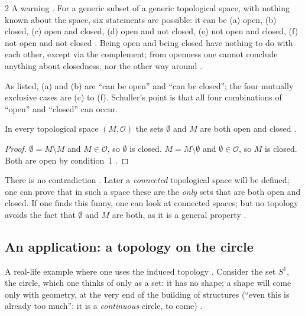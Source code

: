 \begin{paracol}{2}
A warning . For a generic subset of a generic topological space, with nothing known about the
space, six statements are possible: it can be (a) open, (b) closed, (c) open and closed, (d) open and not closed, (e)
not open and closed, (f) not open and not closed . Being open and being closed have
nothing to do with each other, except via the complement; from openness one cannot conclude anything about closedness, nor
the other way around .
\begin{coursenote}
As listed, (a) and (b) are ``can be open'' and ``can be closed''; the four mutually exclusive cases are
(c) to (f). Schuller's point is that all four combinations of ``open'' and ``closed'' can occur.
\end{coursenote}

\begin{proposition}\label{prop:to-clopen}
In every topological space $(M,\mathcal O)$ the sets $\emptyset$ and $M$ are both open and closed
.
\end{proposition}
\begin{proof}
$\emptyset=M\setminus M$ and $M\in\mathcal O$, so $\emptyset$ is closed. $M=M\setminus\emptyset$ and
$\emptyset\in\mathcal O$, so $M$ is closed. Both are open by condition~1 .
\end{proof}
There is no contradiction . Later a \emph{connected} topological space will be defined; one can prove
that in such a space these are the \emph{only} sets that are both open and closed. If one finds this funny, one can look at
connected spaces; but no topology avoids the fact that $\emptyset$ and $M$ are both, as it is a general property
.

\subsection{An application: a topology on the circle}

A real-life example where one uses the induced topology . Consider the set $S^1$, the circle, which one
thinks of only as a set: it has no shape; a shape will come only with geometry, at the very end of the building of
structures (``even this is already too much'': it is a \emph{continuous} circle, to come) .


\end{paracol}
